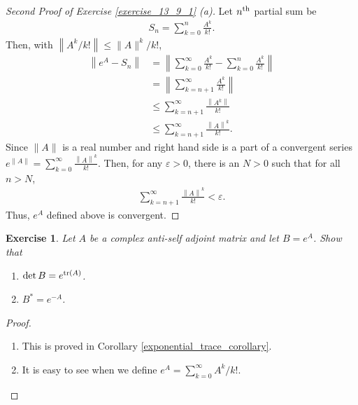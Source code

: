 \documentclass[10pt]{book}
\newtheorem{exercise}{Exercise}[section]
\theoremstyle{definition}
\numberwithin{equation}{chapter}
\begin{document}
\begin{proof}[Second Proof of Exercise \ref{exercise_13_9_1} (a)] \cite{42}
Let $n^{\rm th}$ partial sum be 
\begin{align*}
    S_n = \sum^n_{k=0} \frac{A^k}{k!}.
\end{align*}
Then, with $\left\| A^k / k! \right\| \leq \|A\|^k / k!$,
\begin{align*}
    \left\| e^A - S_n \right\| & = \left\| \sum^\infty_{k=0} \frac{A^k}{k!} - \sum^n_{k=0} \frac{A^k}{k!} \right\| \\
    & = \left\| \sum^\infty_{k=n+1} \frac{A^k}{k!} \right\| \\
    & \leq \sum^\infty_{k=n+1} \frac{\left\|A^k\right\|}{k!} \\
    & \leq \sum^\infty_{k=n+1} \frac{\left\|A\right\|^k}{k!}.
\end{align*}
Since $\|A\|$ is a real number and right hand side is a part of a convergent series $e^{\|A\|} = \sum^\infty_{k=0} \frac{\left\|A\right\|^k}{k!}$. Then, for any $\varepsilon > 0$, there is an $N > 0$ such that for all $n > N$,
\begin{align*}
    \sum^\infty_{k=n+1} \frac{\left\|A\right\|^k}{k!} < \varepsilon.
\end{align*}
Thus, $e^A$ defined above is convergent.
\end{proof}

\medskip

\begin{exercise}
Let $A$ be a complex anti-self adjoint matrix and let $B = e^A$. Show that
\begin{enumerate}[label=(\alph*)]
    \item $\det B = e^{\tr(A)}$.
    
    \item $B^* = e^{-A}$.
\end{enumerate}
\end{exercise}
\begin{proof}
~\begin{enumerate}[label=(\alph*)]
    \item This is proved in Corollary \ref{exponential_trace_corollary}.
    
    \item It is easy to see when we define $e^A = \sum^\infty_{k=0} A^k/k!$.
\end{enumerate}
\end{proof}

\medskip
\end{document}
